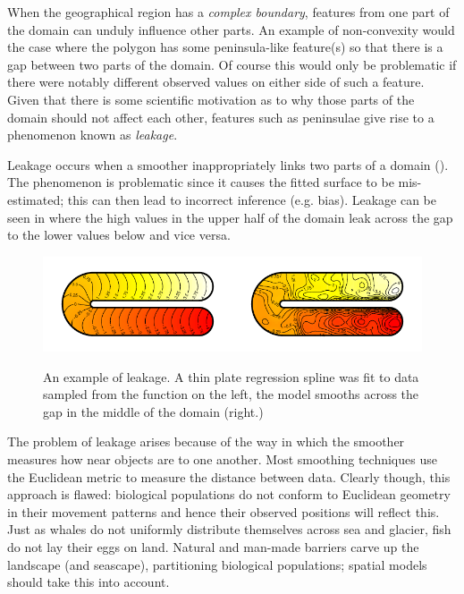 When the geographical region has a \emph{complex boundary}, features from one part of the domain can unduly influence other parts. An example of non-convexity would the case where the polygon has some peninsula-like feature(s) so that there is a gap between two parts of the domain. Of course this would only be problematic if there were notably different observed values on either side of such a feature. Given that there is some scientific motivation as to why those parts of the domain should not affect each other, features such as peninsulae give rise to a phenomenon known as \emph{leakage}.

Leakage occurs when a smoother inappropriately links two parts of a domain (\cite{soap}). The phenomenon is problematic since it causes the fitted surface to be mis-estimated; this can then lead to incorrect inference (e.g. bias). Leakage can be seen in  where the high values in the upper half of the domain leak across the gap to the lower values below and vice versa.

\begin{figure}
\centering
\includegraphics{intro/figs/ramsay-leak.pdf}\\
\caption{An example of leakage. A thin plate regression spline was fit to data sampled from the function on the left, the model smooths across the gap in the middle of the domain (right.)}
\label{leakage}
\end{figure}

The problem of leakage arises because of the way in which the smoother measures how near objects are to one another. Most smoothing techniques use the Euclidean metric to measure the distance between data. Clearly though, this approach is flawed: biological populations do not conform to Euclidean geometry in their movement patterns and hence their observed positions will reflect this. Just as whales do not uniformly distribute themselves across sea and glacier, fish do not lay their eggs on land. Natural and man-made barriers carve up the landscape (and seascape), partitioning biological populations; spatial models should take this into account.

